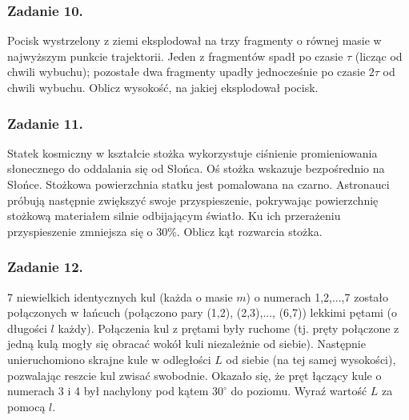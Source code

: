 \documentclass[a4paper, twocolumn]{article}
\begin{document}
\subsubsection*{Zadanie 10.}

Pocisk wystrzelony z ziemi eksplodował na trzy fragmenty o równej masie w najwyższym punkcie trajektorii. Jeden z fragmentów spadł po czasie \(\tau\) (licząc od chwili wybuchu); pozostałe dwa fragmenty upadły jednocześnie po czasie \(2\tau\) od chwili wybuchu. Oblicz wysokość, na jakiej eksplodował pocisk.

\subsubsection*{Zadanie 11.}
Statek kosmiczny w kształcie stożka wykorzystuje ciśnienie promieniowania słonecznego do oddalania się od Słońca. Oś stożka wskazuje bezpośrednio na Słońce. Stożkowa powierzchnia statku jest pomalowana na czarno. Astronauci próbują następnie zwiększyć swoje przyspieszenie, pokrywając powierzchnię stożkową materiałem silnie odbijającym światło. Ku ich przerażeniu przyspieszenie zmniejsza się o 30\%. Oblicz kąt rozwarcia stożka.

\subsubsection*{Zadanie 12.}
7 niewielkich identycznych kul (każda o masie \(m\)) o numerach 1,2,...,7 zostało połączonych w łańcuch (połączono pary (1,2), (2,3),..., (6,7)) lekkimi pętami (o długości \(l\) każdy). Połączenia kul z prętami były ruchome (tj. pręty połączone z jedną kulą mogły się obracać wokół kuli niezależnie od siebie). Następnie unieruchomiono skrajne kule w odległości \(L\) od siebie (na tej samej wysokości), pozwalając reszcie kul zwisać swobodnie. Okazało się, że pręt łączący kule o numerach 3 i 4 był nachylony pod kątem \(30^\circ\) do poziomu. Wyraź wartość \(L\) za pomocą \(l\).
\end{document}
